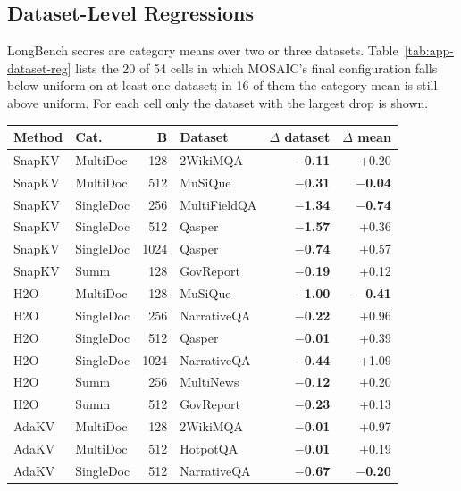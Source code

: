 \subsection{Dataset-Level Regressions}
\label{app:dataset-reg}

LongBench scores are category means over two or three datasets. Table~\ref{tab:app-dataset-reg} lists the 20 of 54 cells in which MOSAIC's final configuration falls below uniform on at least one dataset; in 16 of them the category mean is still above uniform. For each cell only the dataset with the largest drop is shown.

\begin{table}[t]
  \centering
  \scriptsize
  \setlength{\tabcolsep}{3pt}
  \begin{tabular}{@{}l l r l r r@{}}
    \toprule
    Method & Cat. & B & Dataset & $\Delta$ dataset & $\Delta$ mean \\
    \midrule
    SnapKV & MultiDoc & 128 & 2WikiMQA & \textbf{$-$0.11} & +0.20 \\
    SnapKV & MultiDoc & 512 & MuSiQue & \textbf{$-$0.31} & \textbf{$-$0.04} \\
    SnapKV & SingleDoc & 256 & MultiFieldQA & \textbf{$-$1.34} & \textbf{$-$0.74} \\
    SnapKV & SingleDoc & 512 & Qasper & \textbf{$-$1.57} & +0.36 \\
    SnapKV & SingleDoc & 1024 & Qasper & \textbf{$-$0.74} & +0.57 \\
    SnapKV & Summ & 128 & GovReport & \textbf{$-$0.19} & +0.12 \\
    H2O & MultiDoc & 128 & MuSiQue & \textbf{$-$1.00} & \textbf{$-$0.41} \\
    H2O & SingleDoc & 256 & NarrativeQA & \textbf{$-$0.22} & +0.96 \\
    H2O & SingleDoc & 512 & Qasper & \textbf{$-$0.01} & +0.39 \\
    H2O & SingleDoc & 1024 & NarrativeQA & \textbf{$-$0.44} & +1.09 \\
    H2O & Summ & 256 & MultiNews & \textbf{$-$0.12} & +0.20 \\
    H2O & Summ & 512 & GovReport & \textbf{$-$0.23} & +0.13 \\
    AdaKV & MultiDoc & 128 & 2WikiMQA & \textbf{$-$0.01} & +0.97 \\
    AdaKV & MultiDoc & 512 & HotpotQA & \textbf{$-$0.01} & +0.19 \\
    AdaKV & SingleDoc & 512 & NarrativeQA & \textbf{$-$0.67} & \textbf{$-$0.20} \\

\end{tabular}
\end{table}
